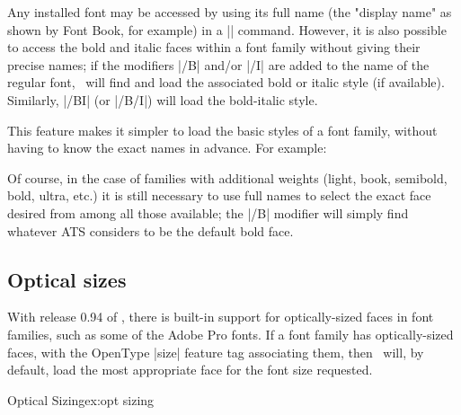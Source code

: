 Any installed font may be accessed by using its full name (the "display name" as shown by Font Book, for example) in a |\font| command. However, it is also possible to access the bold and italic faces within a font family without giving their precise names; if the modifiers |/B| and/or |/I| are added to the name of the regular font, \XeTeX\ will find and load the associated bold or italic style (if available). Similarly, |/BI| (or |/B/I|) will load the bold-italic style.

This feature makes it simpler to load the basic styles of a font family, without having to know the exact names in advance. For example:


\begin{comment}
\begin{tabular}{ll}
\em Name specified&\em Font used\cr
\showfont{"Palatino Linotype/B"}{Palatino Linotype Bold}
\showfont{"Times New Roman/B"}{Times New Roman Bold}
\showfont{"Times New Roman/I"}{Times New Roman Italic}
^^A\showfont{"Linux Libertine O/BI"}{Linux Libertine Black Italic}
\end{tabular}
\end{comment}



Of course, in the case of families with additional weights (light, book, semibold, bold, ultra, etc.) it is still necessary to use full names to select the exact face desired from among all those available; the |/B| modifier will simply find whatever ATS considers to be the default bold face.

\subsection{Optical sizes}

With release 0.94 of \XeTeX, there is built-in support for optically-sized faces in font families, such as some of the Adobe Pro fonts. If a font family has optically-sized faces, with the OpenType |size| feature tag associating them, then \XeTeX\ will, by default, load the most appropriate face for the font size requested. 

\begin{texexample}{Optical Sizing}{ex:opt sizing}
\bgroup
\egroup
\end{texexample}

\begin{comment}
%
%
\end{comment}

